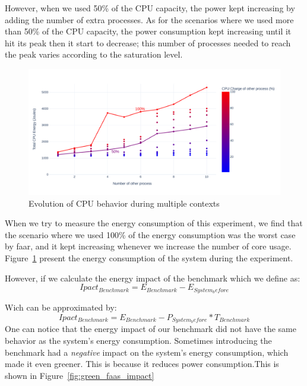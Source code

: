 However, when we used 50\% of the CPU capacity, the power kept increasing by adding the number of extra processes. As for the scenarios where we used more than 50\% of the CPU capacity, the power consumption kept increasing until it hit its peak then it start to decrease; this number of processes needed to reach the peak varies according to the saturation level.
\begin{figure}[!h]
      \centering
      \caption{Evolution of CPU behavior during multiple contexts }
      \label{fig:green_faas_energy}
      \includegraphics[width=\linewidth]{chapters/green_faas_energy}
\end{figure}

When we try to measure the energy consumption of this experiment, we find that the scenario where we used 100\% of the energy consumption was the worst case by faar, and it kept increasing whenever we increase the number of core usage. Figure~\ref{fig:green_faas_energy} present the energy consumption of the system during the experiment.

However, if we calculate the energy impact of the benchmark which we define as: 
\begin{equation}
      Ipact_{Benchmark} =E_{Benchmark} - E_{System_before}
\end{equation}

Wich can be approximated by: 
\begin{equation}
      Ipact_{Benchmark} =E_{Benchmark} - P_{System_before} * T_{Benchmark}
\end{equation}
One can notice that the energy impact of our benchmark did not have the same behavior as the system's energy consumption. Sometimes introducing the benchmark had a \emph{negative} impact on the system's energy consumption, which made it even greener. This is because it reduces power consumption.This is shown in Figure~\ref{fig:green_faas_impact}


